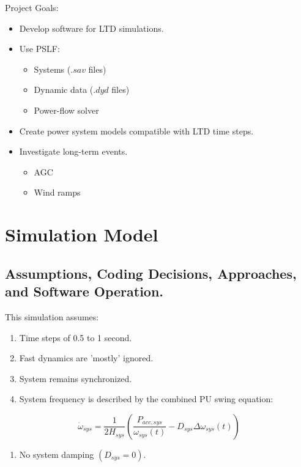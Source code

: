\documentclass[14pt, unknownkeysallowed]{beamer}
\newcounter{assumptions}
\begin{document}
\begin{frame}
Project Goals:
\begin{itemize}
	\item Develop software for LTD simulations.
	\item Use PSLF:
	\begin{itemize}
		\item Systems ($.sav$ files)
		\item Dynamic data ($.dyd$ files)
		\item Power-flow solver
	\end{itemize}
	\item Create power system models compatible with LTD time steps.
	\item Investigate long-term events.
	\begin{itemize}
		\item AGC
		\item Wind ramps
	\end{itemize}
\end{itemize}
\end{frame}

\section{Simulation Model}
\subsection{Assumptions, Coding Decisions, Approaches, and Software Operation.}
\begin{frame}
This simulation assumes:
\begin{enumerate}
\item Time steps of 0.5 to 1 second.
\item Fast dynamics are 'mostly' ignored.
\item System remains synchronized.
\item System frequency is described by the combined PU swing equation:
\setcounter{assumptions}{\value{enumi}} %
\end{enumerate}
\[ \dot{\omega}_{sys} = \dfrac{1}{2H_{sys} } \left( \dfrac{P_{acc, sys} }{\omega_{sys}(t)} - D_{sys}\Delta\omega_{sys}(t)  \right)\] 
\begin{enumerate}
\setcounter{enumi}{\value{assumptions}}
\item No system damping $(D_{sys} = 0)$.
\end{enumerate}
\end{frame}
\end{document}
